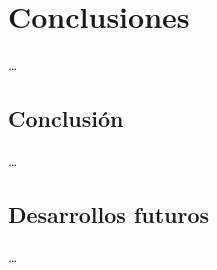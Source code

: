 \chapter{Conclusiones}

\ldots{}

\section{Conclusión}
\label{sec:org2501299}

\ldots{}

\section{Desarrollos futuros}
\label{sec:org301a110}

\ldots{}
